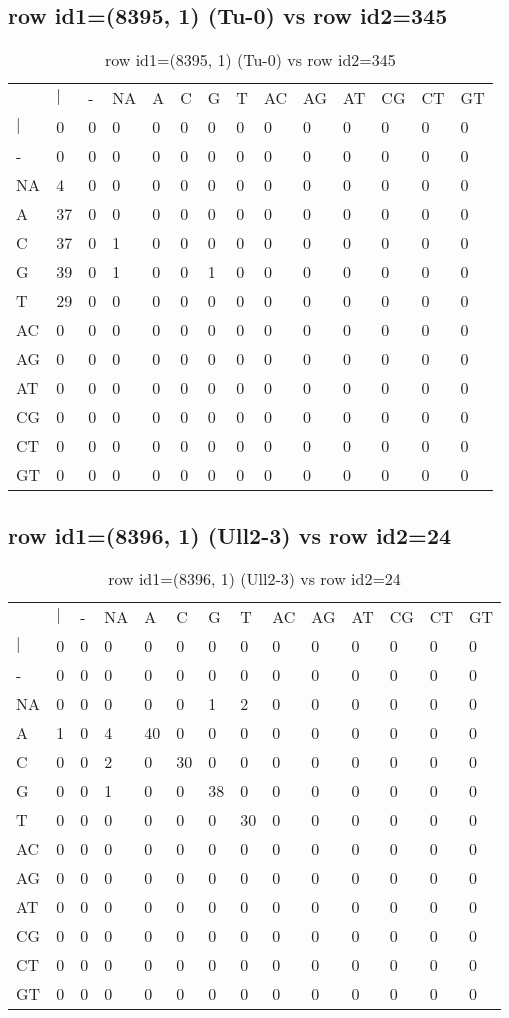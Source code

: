 \subsection{row id1=(8395, 1) (Tu-0) vs row id2=345}
\begin{center}
\begin{longtable}{|l|l|l|l|l|l|l|l|l|l|l|l|l|l|}
\caption{row id1=(8395, 1) (Tu-0) vs row id2=345} \label{table_dm450}\\
\hline
\\
\hline
&$|$&-&NA&A&C&G&T&AC&AG&AT&CG&CT&GT\\
$|$&0&0&0&0&0&0&0&0&0&0&0&0&0\\
-&0&0&0&0&0&0&0&0&0&0&0&0&0\\
NA&4&0&0&0&0&0&0&0&0&0&0&0&0\\
A&37&0&0&0&0&0&0&0&0&0&0&0&0\\
C&37&0&1&0&0&0&0&0&0&0&0&0&0\\
G&39&0&1&0&0&1&0&0&0&0&0&0&0\\
T&29&0&0&0&0&0&0&0&0&0&0&0&0\\
AC&0&0&0&0&0&0&0&0&0&0&0&0&0\\
AG&0&0&0&0&0&0&0&0&0&0&0&0&0\\
AT&0&0&0&0&0&0&0&0&0&0&0&0&0\\
CG&0&0&0&0&0&0&0&0&0&0&0&0&0\\
CT&0&0&0&0&0&0&0&0&0&0&0&0&0\\
GT&0&0&0&0&0&0&0&0&0&0&0&0&0\\
\hline
\end{longtable}
\end{center}

\subsection{row id1=(8396, 1) (Ull2-3) vs row id2=24}
\begin{center}
\begin{longtable}{|l|l|l|l|l|l|l|l|l|l|l|l|l|l|}
\caption{row id1=(8396, 1) (Ull2-3) vs row id2=24} \label{table_dm452}\\
\hline
\\
\hline
&$|$&-&NA&A&C&G&T&AC&AG&AT&CG&CT&GT\\
$|$&0&0&0&0&0&0&0&0&0&0&0&0&0\\
-&0&0&0&0&0&0&0&0&0&0&0&0&0\\
NA&0&0&0&0&0&1&2&0&0&0&0&0&0\\
A&1&0&4&40&0&0&0&0&0&0&0&0&0\\
C&0&0&2&0&30&0&0&0&0&0&0&0&0\\
G&0&0&1&0&0&38&0&0&0&0&0&0&0\\
T&0&0&0&0&0&0&30&0&0&0&0&0&0\\
AC&0&0&0&0&0&0&0&0&0&0&0&0&0\\
AG&0&0&0&0&0&0&0&0&0&0&0&0&0\\
AT&0&0&0&0&0&0&0&0&0&0&0&0&0\\
CG&0&0&0&0&0&0&0&0&0&0&0&0&0\\
CT&0&0&0&0&0&0&0&0&0&0&0&0&0\\
GT&0&0&0&0&0&0&0&0&0&0&0&0&0\\
\hline
\end{longtable}
\end{center}

